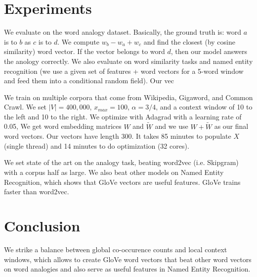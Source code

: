 \documentclass[a4paper]{article}
\begin{document}
\section{Experiments}
We evaluate on the word analogy dataset. Basically, the ground truth is:
word $a$ is to $b$ as $c$ is to $d$. We compute $w_{b} - w_{a} + w_{c}$ and
find the closest (by cosine similarity) word vector. If the vector belongs to
word $d$, then our model answers the anology correctly. We also evaluate on
word similarity tasks and named entity recognition (we use a given set of
features + word vectors for a 5-word window and feed them into a conditional
random field). Our vec

We train on multiple corpora that come from Wikipedia, Gigaword, and Common
Crawl. We set $|V| = 400,000$, $x_{max} = 100$, $\alpha = 3/4$, and a context
window of 10 to the left and 10 to the right. We optimize with Adagrad with
a learning rate of 0.05, We get word embedding matrices $W$ and $\tilde{W}$
and we use $W + \tilde{W}$ as our final word vectors. Our vectors have length
300. It takes 85 minutes to populate $X$ (single thread) and 14 minutes to
do optimization (32 cores).

We set state of the art on the analogy task, beating word2vec (i.e. Skipgram)
with a corpus half as large. We also beat other models on Named Entity
Recognition, which shows that GloVe vectors are useful features. GloVe trains
faster than word2vec.

\section{Conclusion}
We strike a balance between global co-occurence counts and local context
windows, which allows to create GloVe word vectors that beat other word
vectors on word analogies and also serve as useful features in Named Entity
Recognition.
\end{document}
